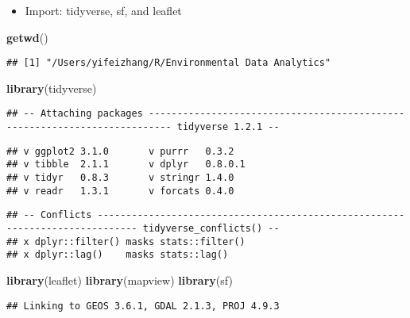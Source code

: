 \documentclass[]{article}
\newenvironment{Shaded}{\begin{snugshade}}{\end{snugshade}}
\newcommand{\KeywordTok}[1]{\textcolor[rgb]{0.13,0.29,0.53}{\textbf{#1}}}
\newcommand{\NormalTok}[1]{#1}
\providecommand{\tightlist}{%
  \setlength{\itemsep}{0pt}\setlength{\parskip}{0pt}}
\begin{document}
\begin{itemize}
\tightlist
\item
  Import: tidyverse, sf, and leaflet
\end{itemize}

\begin{Shaded}
\begin{Highlighting}[]
\KeywordTok{getwd}\NormalTok{()}
\end{Highlighting}
\end{Shaded}

\begin{verbatim}
## [1] "/Users/yifeizhang/R/Environmental Data Analytics"
\end{verbatim}

\begin{Shaded}
\begin{Highlighting}[]
\KeywordTok{library}\NormalTok{(tidyverse)}
\end{Highlighting}
\end{Shaded}

\begin{verbatim}
## -- Attaching packages -------------------------------------------------------------------------- tidyverse 1.2.1 --
\end{verbatim}

\begin{verbatim}
## v ggplot2 3.1.0       v purrr   0.3.2  
## v tibble  2.1.1       v dplyr   0.8.0.1
## v tidyr   0.8.3       v stringr 1.4.0  
## v readr   1.3.1       v forcats 0.4.0
\end{verbatim}

\begin{verbatim}
## -- Conflicts ----------------------------------------------------------------------------- tidyverse_conflicts() --
## x dplyr::filter() masks stats::filter()
## x dplyr::lag()    masks stats::lag()
\end{verbatim}

\begin{Shaded}
\begin{Highlighting}[]
\KeywordTok{library}\NormalTok{(leaflet)}
\KeywordTok{library}\NormalTok{(mapview)}
\KeywordTok{library}\NormalTok{(sf)}
\end{Highlighting}
\end{Shaded}

\begin{verbatim}
## Linking to GEOS 3.6.1, GDAL 2.1.3, PROJ 4.9.3
\end{verbatim}
\end{document}
